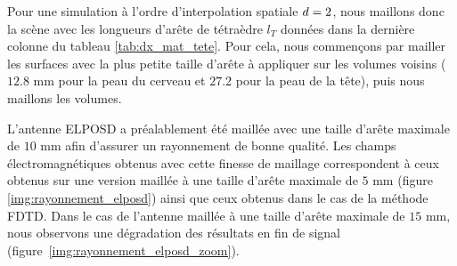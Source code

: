 Pour une simulation à l'ordre d'interpolation spatiale $d=2$,
nous maillons donc la scène avec les longueurs d'arête de tétraèdre $l_T$
données dans la dernière colonne du tableau \ref{tab:dx_mat_tete}.
Pour cela, nous commençons par mailler les surfaces avec la plus
petite taille d'arête à appliquer sur les volumes voisins
($12.8$ mm pour la peau du cerveau et $27.2$ pour la peau de la tête),
puis nous maillons les volumes.

L'antenne ELPOSD a préalablement été maillée avec une taille d'arête
maximale de $10$ mm afin d'assurer un rayonnement de bonne qualité.
Les champs électromagnétiques obtenus avec cette finesse de maillage correspondent
à ceux obtenus sur une version maillée à une taille d'arête maximale de $5$ mm
(figure \ref{img:rayonnement_elposd}) ainsi que ceux obtenus dans le cas de la méthode FDTD.
Dans le cas de l'antenne maillée à une taille d'arête maximale de $15$ mm,
nous observons une dégradation des résultats en fin de signal
(figure~\ref{img:rayonnement_elposd_zoom}).

